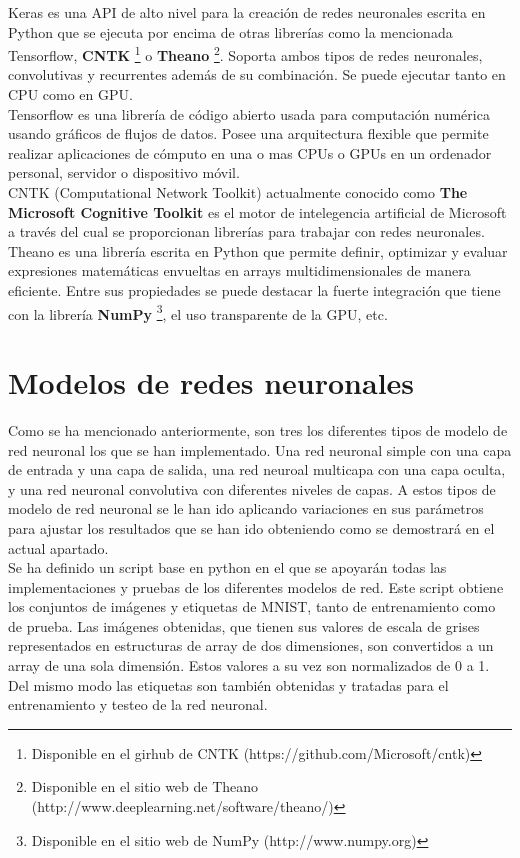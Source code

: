 \documentclass[10pt]{article}
\begin{document}
Keras es una API de alto nivel para la creación de redes neuronales escrita en Python que se ejecuta por encima de otras librerías como la mencionada Tensorflow, \textbf{CNTK} \footnote{Disponible en el girhub de CNTK (https://github.com/Microsoft/cntk)} o \textbf{Theano} \footnote{Disponible en el sitio web de Theano (http://www.deeplearning.net/software/theano/)}. Soporta ambos tipos de redes neuronales, convolutivas y recurrentes además de su combinación. Se puede ejecutar tanto en CPU como en GPU. \\

Tensorflow es una librería de código abierto usada para computación numérica usando gráficos de flujos de datos. Posee una arquitectura flexible que permite realizar aplicaciones de cómputo en una o mas CPUs o GPUs en un ordenador personal, servidor o dispositivo móvil. \\

CNTK (Computational Network Toolkit) actualmente conocido como \textbf{The Microsoft Cognitive Toolkit} es el motor de intelegencia artificial de Microsoft a través del cual se proporcionan librerías para trabajar con redes neuronales. \\

Theano es una librería escrita en Python que permite definir, optimizar y evaluar expresiones matemáticas envueltas en arrays multidimensionales de manera eficiente. Entre sus propiedades se puede destacar la fuerte integración que tiene con la librería \textbf{NumPy} \footnote{Disponible en el sitio web de NumPy (http://www.numpy.org)}, el uso transparente de la GPU, etc. \\



\section{Modelos de redes neuronales} 
Como se ha mencionado anteriormente, son tres los diferentes tipos de modelo de red neuronal los que se han implementado. Una red neuronal simple con una capa de entrada y una capa de salida, una red neuroal multicapa con una capa oculta, y una red neuronal convolutiva con diferentes niveles de capas. A estos tipos de modelo de red neuronal se le han ido aplicando variaciones en sus parámetros para ajustar los resultados que se han ido obteniendo como se demostrará en el actual apartado. \\

Se ha definido un script base en python en el que se apoyarán todas las implementaciones y pruebas de los diferentes modelos de red. Este script obtiene los conjuntos de imágenes y etiquetas de MNIST, tanto de entrenamiento como de prueba. Las imágenes obtenidas, que tienen sus valores de escala de grises representados en estructuras de array de dos dimensiones, son convertidos a un array de una sola dimensión. Estos valores a su vez son normalizados de 0 a 1. Del mismo modo las etiquetas son también obtenidas y tratadas para el entrenamiento y testeo de la red neuronal. \\
\end{document}
